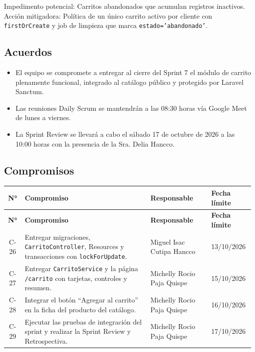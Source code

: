 \documentclass[12pt,a4paper]{article}
\begin{document}
Impedimento potencial: Carritos abandonados que acumulan registros inactivos.\\
Acción mitigadora: Política de un único carrito activo por cliente con \texttt{firstOrCreate} y job de limpieza que marca \texttt{estado='abandonado'}.

\subsection*{Acuerdos}

\begin{itemize}
    \item El equipo se compromete a entregar al cierre del Sprint 7 el módulo de carrito plenamente funcional, integrado al catálogo público y protegido por Laravel Sanctum.
    \item Las reuniones Daily Scrum se mantendrán a las 08:30 horas vía Google Meet de lunes a viernes.
    \item La Sprint Review se llevará a cabo el sábado 17 de octubre de 2026 a las 10:00 horas con la presencia de la Sra. Delia Hancco.
\end{itemize}

\subsection*{Compromisos}

{\small
\begin{longtable}{c p{7.8cm} p{4.2cm} p{2.0cm}}
\toprule
\textbf{N°} & \textbf{Compromiso} & \textbf{Responsable} & \textbf{Fecha límite} \\
\midrule
\endfirsthead

\toprule
\textbf{N°} & \textbf{Compromiso} & \textbf{Responsable} & \textbf{Fecha límite} \\
\midrule
\endhead

\bottomrule
\endlastfoot

C-26 & Entregar migraciones, \texttt{CarritoController}, Resources y transacciones con \texttt{lockForUpdate}. & Miguel Isac Cutipa Hancco & 13/10/2026 \\
C-27 & Entregar \texttt{CarritoService} y la página \texttt{/carrito} con tarjetas, controles y resumen. & Michelly Rocio Paja Quispe & 15/10/2026 \\
C-28 & Integrar el botón ``Agregar al carrito'' en la ficha del producto del catálogo. & Michelly Rocio Paja Quispe & 16/10/2026 \\
C-29 & Ejecutar las pruebas de integración del sprint y realizar la Sprint Review y Retrospectiva. & Michelly Rocio Paja Quispe & 17/10/2026 \\

\end{longtable}
}
\end{document}
